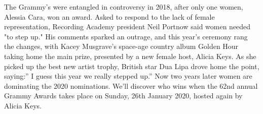 \documentclass{article}
\begin{document}
\pagebreak



\begin{multicols}{2}

The Grammy’s were entangled in controversy in 2018, after only one women, Alessia Cara, won an award. Asked to respond to the lack of female representation, Recording Academy president Neil Portnow said women needed "to step up." His comments sparked an outrage, and this year’s ceremony rang the changes, with Kacey Musgrave’s space-age country album Golden Hour taking home the main prize, presented by a new female host, Alicia Keys. As she picked up the best new artist trophy, British star Dua Lipa drove home the point, saying:” I guess this year we really stepped up.” Now two years later women are dominating the 2020 nominations. We’ll discover who wins when the 62nd annual Grammy Awards takes place on Sunday, 26th January 2020, hosted again by Alicia Keys.

\pagebreak


\end{multicols}
\end{document}
